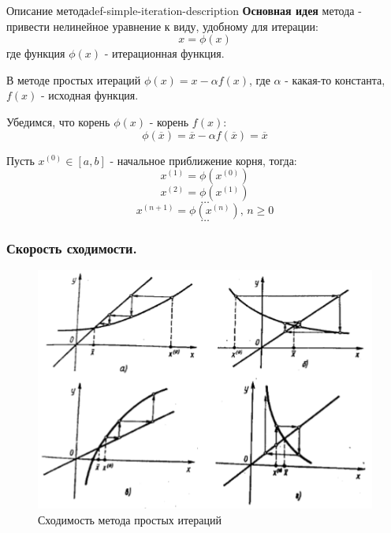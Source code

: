 \documentclass[14pt]{extarticle}
\begin{document}
        \begin{definition}{Описание метода}{def-simple-iteration-description}
            \textbf{Основная идея} метода - привести нелинейное уравнение к виду, удобному для итерации:
            $$x = \phi(x)$$
            где функция $\phi(x)$ - итерационная функция.
            
            \vspace{\baselineskip}

            В методе простых итераций $\phi(x) = x - \alpha f(x)$, где $\alpha$ - какая-то константа, $f(x)$ - исходная функция. 
            
            Убедимся, что корень $\phi(x)$ - корень $f(x)$: 
            $$\phi(\overline{x}) = \overline{x} - \alpha f(\overline{x}) = \overline{x}$$

            Пусть $x^{(0)} \in [a, b]$ - начальное приближение корня, тогда:
            $$x^{(1)} = \phi(x^{(0)})$$
            $$x^{(2)} = \phi(x^{(1)})$$
            $$\ldots$$
            $$x^{(n + 1)} = \phi(x^{(n)}) \text{, } n \geq 0$$
            $$\ldots$$
        \end{definition}

    \subsubsection{Скорость сходимости.}

        \begin{figure}[H]
            \centering
            \includegraphics[scale=0.7]{images/simple-iterations-convergence.png}
            \caption{Сходимость метода простых итераций}
            \label{fig:simple-iterations-example}
        \end{figure}
\end{document}
